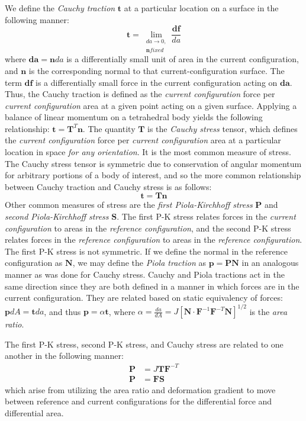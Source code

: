 We define the \textit{Cauchy traction} $\bm{t}$ at a particular location on a surface in the following manner:
\begin{equation}
\bm{t} = \lim_{\substack{{da} \rightarrow 0, \\ {\bm{n} fixed}}} \frac{{\bm{df}}}{da}
\end{equation}
where $\bm{da} = \bm{n}da$ is a differentially small unit of area in the current configuration, and $\bm{n}$ is the corresponding normal to that current-configuration surface. The term $\bm{df}$ is a differentially small force in the current configuration acting on $\bm{da}$. Thus, the Cauchy traction is defined as the \textit{current configuration} force per \textit{current configuration} area at a given point acting on a given surface. Applying a balance of linear momentum on a tetrahedral body yields the following relationship: $\bm{t} = \bm{T}^T\bm{n}$. The quantity $\bm{T}$ is the \textit{Cauchy stress} tensor, which defines the \textit{current configuration} force per \textit{current configuration} area at a particular location in space \textit{for any orientation}. It is the most common measure of stress. The Cauchy stress tensor is symmetric due to conservation of angular momentum for arbitrary portions of a body of interest, and so the more common relationship between Cauchy traction and Cauchy stress is as follows:
\begin{equation}
\bm{t} = \bm{T}\bm{n}
\end{equation}
Other common measures of stress are the \textit{first Piola-Kirchhoff stress} $\bm{P}$ and \textit{second Piola-Kirchhoff stress} $\bm{S}$. The first P-K stress relates forces in the \textit{current configuration} to areas in the \textit{reference configuration}, and the second P-K stress relates forces in the \textit{reference configuration} to areas in the \textit{reference configuration}. The first P-K stress is not symmetric. If we define the normal in the reference configuration as $\bm{N}$, we may define the \textit{Piola traction} as $\bm{p} = \bm{P}\bm{N}$ in an analogous manner as was done for Cauchy stress. Cauchy and Piola tractions act in the same direction since they are both defined in a manner in which forces  are in the current configuration. They are related based on static equivalency of forces: $\bm{p}dA = \bm{t}da$, and thus $\bm{p} = \alpha\bm{t}$, where $\alpha = \frac{da}{dA} = J[\bm{N} \cdot \bm{F}^{-1}\bm{F}^{-T}\bm{N}]^{1/2}$ is the \textit{area ratio}.

The first P-K stress, second P-K stress, and Cauchy stress are related to one another in the following manner:
\begin{align}
\bm{P} &= J\bm{T}\bm{F}^{-T} \\
\bm{P} &= \bm{F}\bm{S}
\end{align}
which arise from utilizing the area ratio and deformation gradient to move between reference and current configurations for the differential force and differential area.

